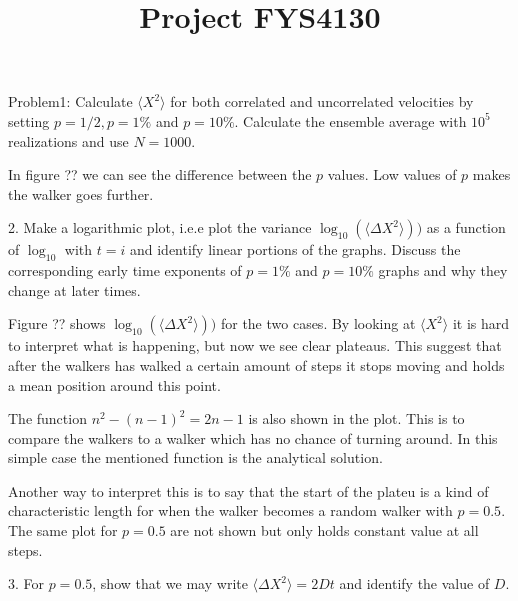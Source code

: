 \documentclass[twocolumn]{article}[10pt]
\title{Project FYS4130}
\begin{document}
\maketitle
{\color{black!70}
Problem1: Calculate $\langle X^2\rangle$ for both correlated and uncorrelated velocities by setting $p=1/2, p=1\%$ and $p=10\%$. Calculate the ensemble average with $10^5$ realizations and use $N = 1000$.
}

In figure ?? we can see the difference between the $p$ values.
Low values of $p$ makes the walker goes further. 

{\color{black!70}2. Make a logarithmic plot, i.e.e plot the variance 
$\log_{10}(\langle\Delta X^2 \rangle))$ as a function of $\log_{10}$ 
with $t = i$ and identify linear portions of the graphs. Discuss the 
corresponding early time exponents of $p=1\%$ and $p=10\%$ graphs and
why they change at later times. 
}

Figure ?? shows $\log_{10}(\langle\Delta X^2 \rangle))$ for the two cases. 
By looking at $\langle X^2\rangle$ it is hard to interpret what is happening,
 but now we see clear plateaus. This suggest that after the walkers
has walked a certain amount of steps it stops moving and holds a mean 
position around this point. 

The function $n^2 - (n-1)^2 = 2n-1$ is also shown in the plot. This is to
compare the walkers to a walker which has no chance of turning around.
In this simple case the mentioned function is the analytical solution. 

Another way to interpret this is to say that the start of the plateu
is a kind of characteristic length for when the walker becomes a 
random walker with $p = 0.5$. The same plot for $p = 0.5$ are not shown
but only holds constant value at all steps. 

{\color{black!70} 3. For $p=0.5$, show that we may write 
$\langle\Delta X^2 \rangle = 2Dt$ and identify the value of $D$.
}
\end{document}
